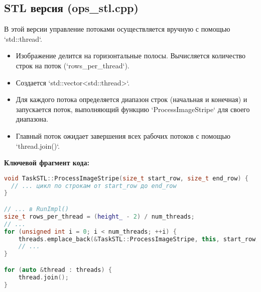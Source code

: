 \documentclass[12pt,a4paper]{extarticle}
\begin{document}
\subsection{STL версия (ops\_stl.cpp)}
В этой версии управление потоками осуществляется вручную с помощью `std::thread`.
\begin{itemize}
    \item Изображение делится на горизонтальные полосы. Вычисляется количество строк на поток (`rows_per_thread`).
    \item Создается `std::vector<std::thread>`.
    \item Для каждого потока определяется диапазон строк (начальная и конечная) и запускается поток, выполняющий функцию `ProcessImageStripe` для своего диапазона.
    \item Главный поток ожидает завершения всех рабочих потоков с помощью `thread.join()`.
\end{itemize}

\textbf{Ключевой фрагмент кода:}
\begin{lstlisting}[language=C++]
void TaskSTL::ProcessImageStripe(size_t start_row, size_t end_row) {
  // ... цикл по строкам от start_row до end_row
}

// ... в RunImpl()
size_t rows_per_thread = (height_ - 2) / num_threads;
// ...
for (unsigned int i = 0; i < num_threads; ++i) {
    threads.emplace_back(&TaskSTL::ProcessImageStripe, this, start_row, end_row);
    // ...
}

for (auto &thread : threads) {
    thread.join();
}
\end{lstlisting}
\end{document}
